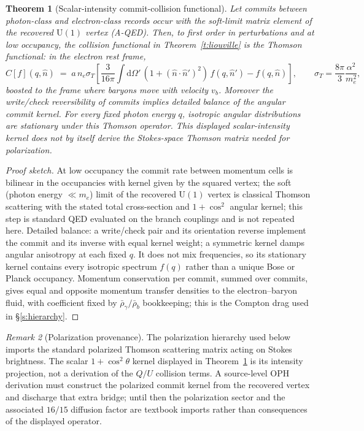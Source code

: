 \documentclass[11pt]{article}
\newtheorem{theorem}{Theorem}[section]
\theoremstyle{remark}
\newtheorem{remark}[theorem]{Remark}
\newcommand{\Dd}{\mathrm{d}}
\begin{document}
\begin{theorem}[Scalar-intensity commit-collision functional]\label{t:collision}
Let commits between photon-class and electron-class records occur with the
soft-limit matrix element of the recovered $\mathrm U(1)$ vertex (A-QED).
Then, to first order in perturbations and at low occupancy, the collision
functional in Theorem~\ref{t:liouville} is the Thomson functional: in the
electron rest frame,
\[
C[f](q,\hat n)\;=\;a\,n_e\sigma_T\left[
\frac{3}{16\pi}\int \Dd\Omega'\,(1+(\hat n\cdot\hat n')^2)\,f(q,\hat n')
- f(q,\hat n)\right],
\qquad
\sigma_T=\frac{8\pi}{3}\frac{\alpha^2}{m_e^2},
\]
boosted to the frame where baryons move with velocity $v_b$. Moreover the
write/check reversibility of commits implies detailed balance of the angular
commit kernel. For every fixed photon energy $q$, isotropic angular
distributions are stationary under this Thomson operator. This displayed
scalar-intensity kernel does not by itself derive the Stokes-space Thomson
matrix needed for polarization.
\end{theorem}

\begin{proof}[Proof sketch]
At low occupancy the commit rate between momentum cells is bilinear in the
occupancies with kernel given by the squared vertex; the soft
(photon energy $\ll m_e$) limit of the recovered $\mathrm U(1)$ vertex is
classical Thomson scattering with the stated total cross-section and
$1+\cos^2$ angular kernel; this step is standard QED evaluated on the branch
couplings and is not repeated here. Detailed balance: a write/check pair and
its orientation reverse implement the commit and its inverse with equal
kernel weight; a symmetric kernel damps angular anisotropy at each fixed
$q$. It does not mix frequencies, so its stationary kernel contains every
isotropic spectrum $f(q)$ rather than a unique Bose or Planck occupancy.
Momentum conservation per commit, summed over
commits, gives equal and opposite momentum transfer densities to the
electron--baryon fluid, with coefficient fixed by
$\bar\rho_\gamma/\bar\rho_b$ bookkeeping; this is the Compton drag used in
\S\ref{s:hierarchy}.
\end{proof}

\begin{remark}[Polarization provenance]
The polarization hierarchy used below imports the standard polarized
Thomson scattering matrix acting on Stokes brightness.  The scalar
$1+\cos^2\theta$ kernel displayed in Theorem~\ref{t:collision} is its
intensity projection, not a derivation of the $Q/U$ collision terms.  A
source-level OPH derivation must construct the polarized commit kernel from
the recovered vertex and discharge that extra bridge; until then the
polarization sector and the associated $16/15$ diffusion factor are
textbook imports rather than consequences of the displayed operator.
\end{remark}
\end{document}
